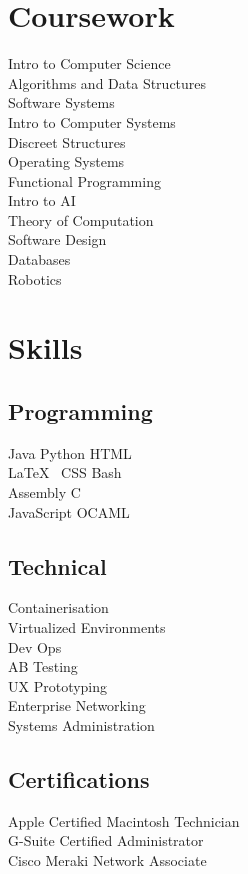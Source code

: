 \documentclass[]{deedy-resume-openfont}
\begin{document}
\begin{minipage}[t]{0.33\textwidth}

\section{Coursework}
Intro to Computer Science \\
Algorithms and Data Structures \\
Software Systems \\
Intro to Computer Systems \\
Discreet Structures \\
Operating Systems \\
Functional Programming \\
Intro to AI \\
Theory of Computation \\
Software Design \\
Databases \\
Robotics
\sectionsep


\section{Skills}
\subsection{Programming}
Java \textbullet{} Python \textbullet{} HTML\\
\LaTeX\ \textbullet{} CSS \textbullet{} Bash\\ 
Assembly \textbullet{} \textbullet{} C\\
JavaScript \textbullet{} OCAML\\
\sectionsep
\subsection{Technical}
Containerisation\\
Virtualized Environments\\ 
Dev Ops\\
AB Testing\\
UX Prototyping\\
Enterprise Networking\\
Systems Administration\\
\sectionsep
\subsection{Certifications}
Apple Certified Macintosh Technician\\
G-Suite Certified Administrator\\
Cisco Meraki Network Associate\\

%
%

\end{minipage} 
\end{document}
